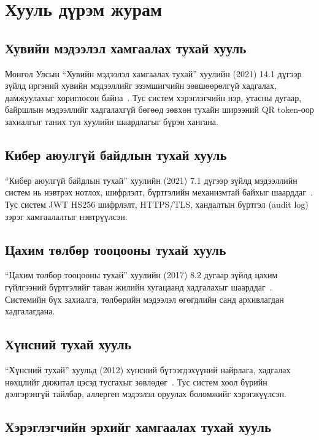 \section{Хууль дүрэм журам}

\subsection{Хувийн мэдээлэл хамгаалах тухай хууль}

Монгол Улсын ``Хувийн мэдээлэл хамгаалах тухай'' хуулийн (2021) 14.1 дүгээр зүйлд
иргэний хувийн мэдээллийг эзэмшигчийн зөвшөөрөлгүй хадгалах, дамжуулахыг
хориглосон байна~\cite{pil2021}. Тус систем хэрэглэгчийн нэр, утасны дугаар, байршлын
мэдээллийг хадгалахгүй бөгөөд зөвхөн тухайн ширээний QR token-оор захиалгыг
таних тул хуулийн шаардлагыг бүрэн хангана.

\subsection{Кибер аюулгүй байдлын тухай хууль}

``Кибер аюулгүй байдлын тухай'' хуулийн (2021) 7.1 дүгээр зүйлд мэдээллийн систем
нь нэвтрэх нотлох, шифрлэлт, бүртгэлийн механизмтай байхыг шаарддаг~\cite{cslaw2021}.
Тус систем JWT HS256 шифрлэлт, HTTPS/TLS, хандалтын бүртгэл (audit log) зэрэг
хамгаалалтыг нэвтрүүлсэн.

\subsection{Цахим төлбөр тооцооны тухай хууль}

``Цахим төлбөр тооцооны тухай'' хуулийн (2017) 8.2 дугаар зүйлд цахим гүйлгээний
бүртгэлийг таван жилийн хугацаанд хадгалахыг шаарддаг~\cite{eplaw2017}. Системийн
бүх захиалга, төлбөрийн мэдээлэл өгөгдлийн санд архивлагдан хадгалагдана.

\subsection{Хүнсний тухай хууль}

``Хүнсний тухай'' хуульд (2012) хүнсний бүтээгдэхүүний найрлага, хадгалах нөхцлийг
дижитал цэсэд тусгахыг зөвлөдөг~\cite{foodlaw2012}. Тус систем хоол бүрийн дэлгэрэнгүй
тайлбар, аллерген мэдээлэл оруулах боломжийг хэрэгжүүлсэн.

\subsection{Хэрэглэгчийн эрхийг хамгаалах тухай хууль}

